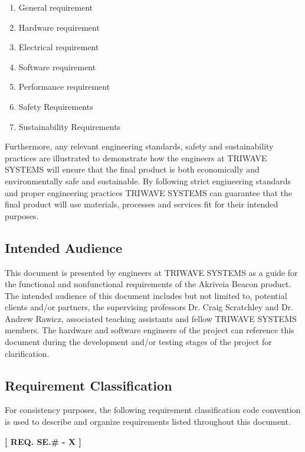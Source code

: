 \begin{enumerate}
	\item General requirement 
	\item Hardware requirement 
	\item Electrical requirement 
	\item Software requirement 
	\item Performance requirement 
	\item Safety Requirements
	\item Sustainability  Requirements
\end{enumerate}
\medskip
Furthermore, any relevant engineering standards, safety and sustainability practices are illustrated to demonstrate how the engineers at TRIWAVE SYSTEMS will ensure that the final product is both economically and environmentally safe and sustainable. By following strict engineering standards and proper engineering practices TRIWAVE SYSTEMS can guarantee that the final product will use materials, processes and services fit for their intended purposes.

\bigskip
\subsection{Intended Audience}
This document is presented by engineers at TRIWAVE SYSTEMS as a guide for the functional and nonfunctional requirements of the Akriveia Beacon product. The intended audience of this document includes but not limited to, potential clients and/or partners, the supervising professors Dr. Craig Scratchley and Dr. Andrew Rawicz, associated teaching assistants and fellow TRIWAVE SYSTEMS members. The hardware and software engineers of the project can reference this document during the development and/or testing stages of the project for clarification.

\break

\subsection{Requirement Classification}
\bigskip
For consistency purposes, the following requirement classification code convention is used to describe and organize requirements listed throughout this document. 
\begin{center}
\bigskip
	\textbf{[ REQ. SE.\# - X ]} 
\end{center}

